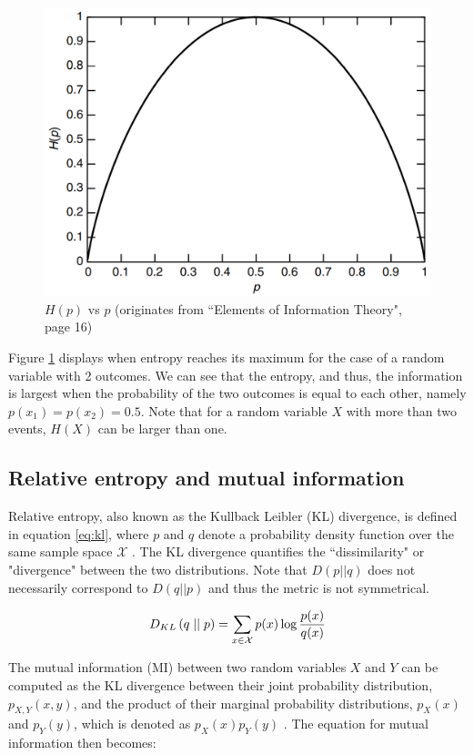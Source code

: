 \begin{figure}[h]
	\centering
	\includegraphics[width=0.4\linewidth]{screenshot005}
	\caption{$H(p)$ vs $p$ (originates from ``Elements of Information Theory", page 16)}
	\label{fig:EntropyvsP}
\end{figure}



Figure \ref{fig:EntropyvsP} displays when entropy reaches its maximum for the case of a random variable with 2 outcomes. We can see that the entropy, and thus, the information is largest when the probability of the two outcomes is equal to each other, namely $p(x_1)=p(x_2)=0.5$. Note that for a random variable $X$ with more than two events, $H(X)$ can be larger than one.

\subsection{Relative entropy and mutual information} \label{cha:rel_entrop}
Relative entropy, also known as the Kullback Leibler (KL) divergence, is defined in equation \ref{eq:kl}, where $p$ and $q$ denote a probability density function over the same sample space $\mathcal{X}$ \cite{coverElementsInformationTheory2006}. The KL divergence quantifies the ``dissimilarity" or "divergence" between the two distributions. Note that $D(p||q)$ does not necessarily correspond to $D(q||p)$ and thus the metric is not symmetrical.

\begin{equation}
	D_{KL} \left( q \mid \mid p \right) = \sum_{x\in\mathcal{X}}p(x) \log \frac{p(x)}{q(x)} \label{eq:kl}
\end{equation}



The mutual information (MI) between two random variables $X$ and $Y$ can be computed as the KL divergence between their joint probability distribution, $p_{X,Y}(x,y)$, and the product of their marginal probability distributions, $p_X(x)$ and $p_Y(y)$, which is denoted as $p_X(x)p_Y(y)$ \cite{coverElementsInformationTheory2006}. The equation for mutual information then becomes:

